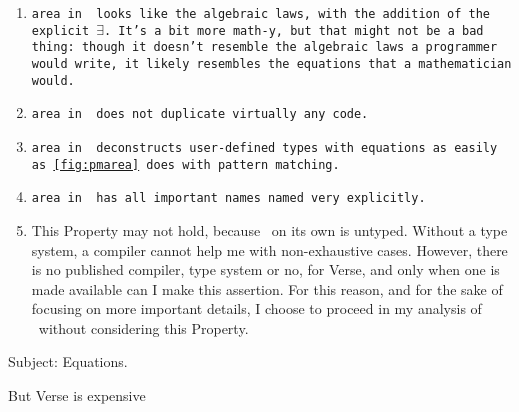 \documentclass[manuscript,screen,review, 12pt, nonacm]{acmart}
\begin{document}
\begin{outline}[enumerate]
    \begin{enumerate}
      \item \tt{area} in \VC\ looks like the algebraic laws, with the addition
      of the explicit $\exists$. It's a bit more math-y, but that might not be
      a bad thing: though it doesn't resemble the algebraic laws a programmer
      would write, it likely resembles the equations that a mathematician would. 
      \item \tt{area} in \VC\ does not duplicate virtually any code. 
      \item \tt{area} in \VC\ deconstructs user-defined types with equations as
      easily as \ref{fig:pmarea} does with pattern matching. 
      \item \tt{area} in \VC\ has all important names named very explicitly.
      \item This Property may not hold, because \VC\ on its own is untyped.
      Without a type system, a compiler cannot help me with non-exhaustive
      cases. However, there is no published compiler, type system or no, for
      Verse, and only when one is made available can I make this assertion. For
      this reason, and for the sake of focusing on more important details, I
      choose to proceed in my analysis of \VC\ without considering this
      Property. 
    \end{enumerate}
        


Subject: Equations. 

But Verse is expensive 

    


    
    


\end{outline}
\end{document}
